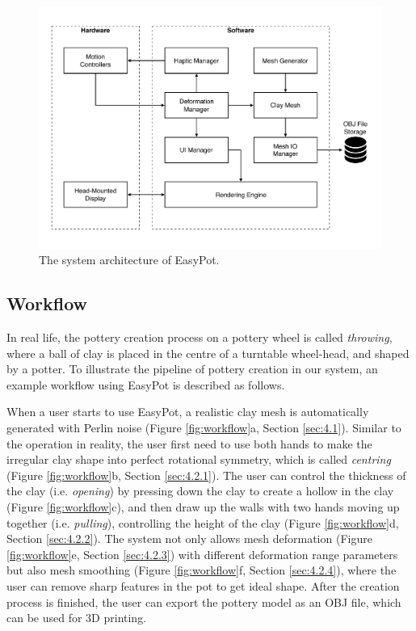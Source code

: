 \documentclass{svjour3}                     %
\begin{document}
\begin{figure}
\includegraphics[width=\textwidth]{arc.pdf}
\caption{The system architecture of EasyPot.}
\label{fig:arc}
\end{figure}



\subsection{Workflow}
\label{sec:3.2}
In real life, the pottery creation process on a pottery wheel is called \textit{throwing}, where a ball of clay is placed in the centre of a turntable wheel-head, and shaped by a potter.
To illustrate the pipeline of pottery creation in our system, an example workflow using EasyPot is described as follows.

When a user starts to use EasyPot, a realistic clay mesh is automatically generated with Perlin noise (Figure \ref{fig:workflow}a, Section \ref{sec:4.1}). 
Similar to the operation in reality, the user first need to use both hands to make the irregular clay shape into perfect rotational symmetry, which is called \textit{centring} (Figure \ref{fig:workflow}b, Section \ref{sec:4.2.1}).
The user can control the thickness of the clay (i.e. \textit{opening}) by pressing down the clay to create a hollow in the clay (Figure \ref{fig:workflow}c), 
and then draw up the walls with two hands moving up together (i.e. \textit{pulling}), controlling the height of the clay (Figure \ref{fig:workflow}d, Section \ref{sec:4.2.2}).
The system not only allows mesh deformation (Figure \ref{fig:workflow}e, Section \ref{sec:4.2.3}) with different deformation range parameters but also mesh smoothing (Figure \ref{fig:workflow}f, Section \ref{sec:4.2.4}), where the user can remove sharp features in the pot to get ideal shape.
After the creation process is finished, the user can export the pottery model as an OBJ file, which can be used for 3D printing.
\end{document}
